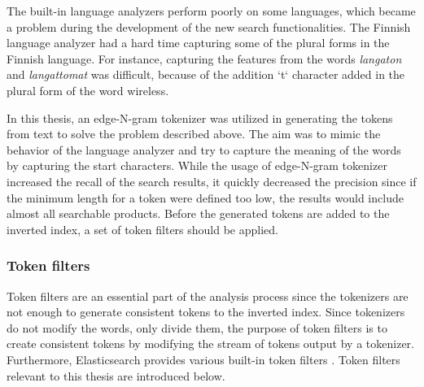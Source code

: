 The built-in language analyzers perform poorly on some languages, which became
a problem during the development of the new search functionalities.
The Finnish language analyzer had a hard time capturing some of the plural forms in the Finnish language.
For instance, capturing the features from the words \emph{langaton} and \emph{langattomat} was difficult,
because of the addition `t` character added in the plural form of the word wireless.


In this thesis, an edge-N-gram tokenizer was utilized in generating the tokens from text to solve the problem described above.
The aim was to mimic the behavior of the language analyzer and try to capture the meaning of the words
by capturing the start characters.
While the usage of edge-N-gram tokenizer increased the recall of the search results, 
it quickly decreased the precision since if the minimum length for a token were defined too low,
the results would include almost all searchable products.
Before the generated tokens are added to the inverted index, a set of token filters
should be applied.


\subsubsection{Token filters}


Token filters are an essential part of the analysis process since the tokenizers are not enough to generate
consistent tokens to the inverted index.
Since tokenizers do not modify the words, only divide them, the purpose of token filters is
to create consistent tokens by modifying the stream of tokens output by a tokenizer.
Furthermore, Elasticsearch provides various built-in token filters \cite{elasticIntro}. 
Token filters relevant to this thesis are introduced below.


